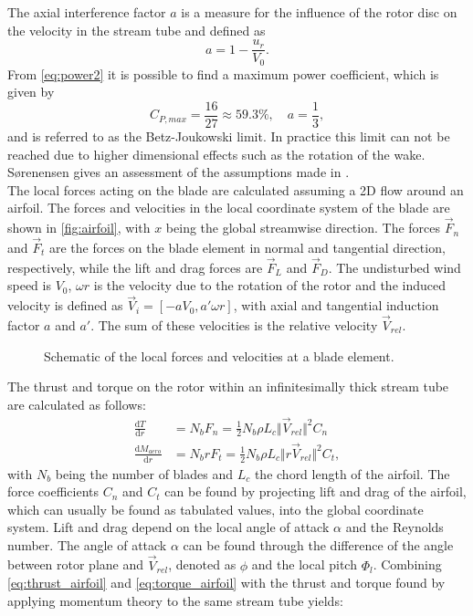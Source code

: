 The axial interference factor $a$ is a measure for the influence of the rotor disc on the velocity in the stream tube and defined as 
\begin{equation}
	a = 1 - \frac{u_r}{V_0}.
\end{equation}  
From \eqref{eq:power2} it is possible to find a maximum power coefficient, which is given by
\begin{equation}
		C_{P,max} = \frac{16}{27} \approx 59.3 \%, \quad a = \frac{1}{3} \label{eq:betz-limit},
\end{equation} 
and is referred to as the Betz-Joukowski limit. In practice this limit can not be reached due to higher dimensional effects such as the rotation of the wake. Sørenensen gives an assessment of the assumptions made in \cite{sorensen_general_2016}. \cite[p. 7 - 11]{sorensen_general_2016} \\
The local forces acting on the blade are calculated assuming a 2D flow around an airfoil. The forces and velocities in the local coordinate system of the blade are shown in \autoref{fig:airfoil}, with $x$ being the global streamwise direction. The forces $\vec{F}_n$ and $\vec{F}_t$ are the forces on the blade element in normal and tangential direction, respectively, while the lift and drag forces are $\vec{F}_L$ and $\vec{F}_D$. The undisturbed wind speed is $V_0$, $\omega r$ is the velocity due to the rotation of the rotor and the induced velocity is defined as $\vec{V}_i = [-a V_0, a'\omega r]$, with axial and tangential induction factor $a$ and $a'$. The sum of these velocities is the relative velocity $\vec{V}_{rel}$. 
\begin{figure}[H]
	\centering
	\def\svgwidth{0.5 \textwidth}
	
	\caption{Schematic of the local forces and velocities at a blade element.}
	\label{fig:airfoil}
\end{figure} 
The thrust and torque on the rotor within an infinitesimally thick stream tube are calculated as follows: 
\begin{align}
\frac{\mathrm{d}T}{\mathrm{d}r} &=N_b F_n = \frac{1}{2}N_b \rho L_c \Vert \vec{V}_{rel} \Vert^2 C_n \label{eq:thrust_airfoil}\\
\frac{\mathrm{d}M_{aero}}{\mathrm{d}r} &= N_b r F_t = \frac{1}{2} N_b\rho L_c \Vert r \vec{V}_{rel} \Vert^2 C_t, \label{eq:torque_airfoil}
\end{align} with $N_b$ being the number of blades and $L_c$ the chord length of the airfoil. The force coefficients $C_n$ and $C_t$ can be found by projecting lift and drag of the airfoil, which can usually be found as tabulated values, into the global coordinate system. Lift and drag depend on the local angle of attack $\alpha$ and the Reynolds number. The angle of attack $\alpha$ can be found through the difference of the angle between rotor plane and $\vec{V}_{rel}$, denoted as $\phi$ and the local pitch $\Phi_l$. Combining \eqref{eq:thrust_airfoil} and \eqref{eq:torque_airfoil} with the thrust and torque found by applying momentum theory to the same stream tube yields:
